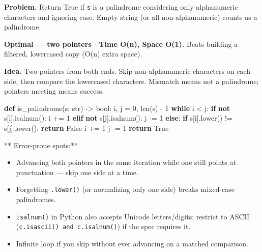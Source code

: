 \documentclass[11pt]{article}
\providecommand{\tightlist}{\setlength{\itemsep}{1pt}\setlength{\parskip}{0pt}}
\newenvironment{Shaded}{\begin{snugshade}}{\end{snugshade}}
\newcommand{\BuiltInTok}[1]{\textcolor[rgb]{0.50,0.55,0.55}{#1}}
\newcommand{\ControlFlowTok}[1]{\textcolor[rgb]{0.99,0.74,0.29}{\textbf{#1}}}
\newcommand{\DecValTok}[1]{\textcolor[rgb]{0.96,0.45,0.00}{#1}}
\newcommand{\KeywordTok}[1]{\textcolor[rgb]{0.81,0.81,0.76}{\textbf{#1}}}
\newcommand{\NormalTok}[1]{\textcolor[rgb]{0.81,0.81,0.76}{#1}}
\newcommand{\OperatorTok}[1]{\textcolor[rgb]{0.81,0.81,0.76}{#1}}
\newcommand{\VariableTok}[1]{\textcolor[rgb]{0.15,0.68,0.68}{#1}}
\begin{document}
\textbf{Problem.} Return True if \texttt{s} is a palindrome considering only alphanumeric characters and ignoring case. Empty string (or all non-alphanumeric) counts as a palindrome.

\textbf{Optimal --- two pointers \(\cdot\) Time O(n), Space O(1).} Beats building a filtered, lowercased copy (O(n) extra space).

\textbf{Idea.} Two pointers from both ends. Skip non-alphanumeric characters on each side, then compare the lowercased characters. Mismatch means not a palindrome; pointers meeting means success.


\begin{Shaded}
\begin{Highlighting}[]
\KeywordTok{def}\NormalTok{ is\_palindrome(s: }\BuiltInTok{str}\NormalTok{) }\OperatorTok{{-}\textgreater{}} \BuiltInTok{bool}\NormalTok{:}
\NormalTok{    i, j }\OperatorTok{=} \DecValTok{0}\NormalTok{, }\BuiltInTok{len}\NormalTok{(s) }\OperatorTok{{-}} \DecValTok{1}
    \ControlFlowTok{while}\NormalTok{ i }\OperatorTok{\textless{}}\NormalTok{ j:}
        \ControlFlowTok{if} \KeywordTok{not}\NormalTok{ s[i].isalnum():}
\NormalTok{            i }\OperatorTok{+=} \DecValTok{1}
        \ControlFlowTok{elif} \KeywordTok{not}\NormalTok{ s[j].isalnum():}
\NormalTok{            j }\OperatorTok{{-}=} \DecValTok{1}
        \ControlFlowTok{else}\NormalTok{:}
            \ControlFlowTok{if}\NormalTok{ s[i].lower() }\OperatorTok{!=}\NormalTok{ s[j].lower():}
                \ControlFlowTok{return} \VariableTok{False}
\NormalTok{            i }\OperatorTok{+=} \DecValTok{1}
\NormalTok{            j }\OperatorTok{{-}=} \DecValTok{1}
    \ControlFlowTok{return} \VariableTok{True}
\end{Highlighting}
\end{Shaded}

** Error-prone spots:**

\begin{itemize}
\tightlist
\item
  Advancing both pointers in the same iteration while one still points at punctuation --- skip one side at a time.
\item
  Forgetting \texttt{.lower()} (or normalizing only one side) breaks mixed-case palindromes.
\item
  \texttt{isalnum()} in Python also accepts Unicode letters/digits; restrict to ASCII (\texttt{c.isascii()\ and\ c.isalnum()}) if the spec requires it.
\item
  Infinite loop if you skip without ever advancing on a matched comparison.
\end{itemize}
\end{document}

